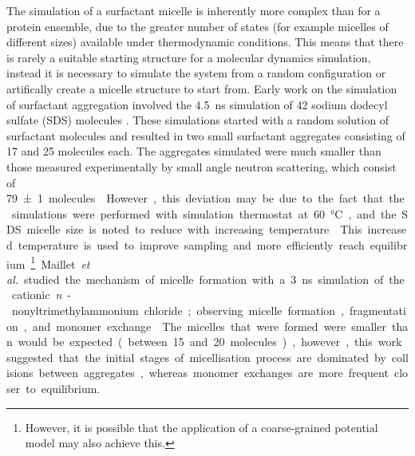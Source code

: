 The simulation of a surfactant micelle is inherently more complex than for a protein ensemble, due to the greater number of states (for example micelles of different sizes) available under thermodynamic conditions.
This means that there is rarely a suitable starting structure for a molecular dynamics simulation, instead it is necessary to simulate the system from a random configuration or artifically create a micelle structure to start from.
Early work on the simulation of surfactant aggregation involved the \SI{4.5}{\nano\second} simulation of 42 sodium dodecyl sulfate (SDS) molecules \cite{tarek_molecular_1998}.
These simulations started with a random solution of surfactant molecules and resulted in two small surfactant aggregates consisting of 17 and 25 molecules each.
The aggregates simulated were much smaller than those measured experimentally by small angle neutron scattering, which consist of \SI{79\pm1} molecules \cite{hassan_small_2003}.
However, this deviation may be due to the fact that the simulations were performed with simulation thermostat at \SI{60}{\celsius}, and the SDS micelle size is noted to reduce with increasing temperature \cite{hayashi_micelle_1980}.
This increased temperature is used to improve sampling and more efficiently reach equilibrium.\footnote{However, it is possible that the application of a coarse-grained potential model may also achieve this.}
Maillet \emph{et al.} studied the mechanism of micelle formation with a \SI{3}{\nano\second} simulation of the cationic \emph{n}-nonyltrimethylammonium chloride; observing micelle formation, fragmentation, and monomer exchange \cite{maillet_large_1999}.
The micelles that were formed were smaller than would be expected (between 15 and 20 molecules), however, this work suggested that the initial stages of micellisation process are dominated by collisions between aggregates, whereas monomer exchanges are more frequent closer to equilibrium.

